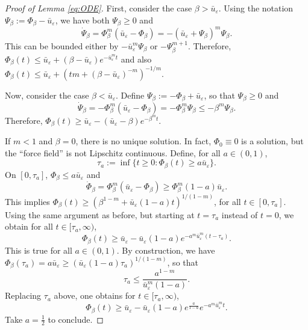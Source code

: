 \documentclass[11pt]{article}
\numberwithin{equation}{section} %
\newcommand{\ep}{\varepsilon}
\newcommand{\be}{\beta}
\def \hal{\frac{1}{2}}
\def \ep{\varepsilon}
\begin{document}
\begin{proof}[Proof of Lemma \ref{eq:ODE}]
    First, consider the case $\be >\bar u_\ep $. Using the notation $\Psi_\be :=  \Phi_\be -\bar u_\ep$, we have both $\Psi_\be \ge 0$ and
    \begin{equation*}
        \dot\Psi_\be = \Phi^m_\be (\bar u_\ep - \Phi_\be) = -(\bar u_\ep + \Psi_\be )^m\Psi_\be.
    \end{equation*}
    This can be bounded either by $-\bar u_\ep^m \Psi_\be$ or $-\Psi_\be^{m+1}$. Therefore, $\Phi_\be(t) \le \bar u_\ep + (\be - \bar u_\ep) e^{-\bar u_\ep^m t}$ and also $\Phi_\be (t) \le\bar u_\ep +  (tm + (\be -\bar u_\ep)^{-m})^{-1/m}$. 

    Now, consider the case $\be <\bar u_\ep$. Define $\Psi_\be := -\Phi_\be + \bar u_\ep$, so that $\Psi_\be\ge 0$ and
    \begin{equation*}
        \dot\Psi_\be = - \Phi_\be^m(\bar u_\ep - \Phi_\be) = -\Phi_\be^m\Psi_\be \le -\be^m \Psi_\be.
    \end{equation*}
    Therefore, $\Phi_\be(t) \ge\bar u_\ep - (\bar u_\ep -\be ) e^{-\be^mt}$.

    If $m<1$ and $\be = 0$, there is no unique solution. In fact, $\Phi_0 \equiv 0$ is a solution, but the ``force field'' is not Lipschitz continuous. Define, for all $a\in (0,1)$,
    \begin{equation*}
        \tau_a := \inf\{t\ge 0 : \Phi_\be (t) \ge a\bar u_\ep\}.
    \end{equation*}
    On $[0,\tau_a]$, $\Phi_\be \le a\bar u_\ep$ and 
    \begin{equation*}
        \dot \Phi_\be = \Phi_\be^m(\bar u_\ep - \Phi_\be)\ge \Phi_\be^m  (1-a) \bar u_\ep.
    \end{equation*}
    This implies $\Phi_\be(t) \ge (\be^{1-m} + \bar u_\ep(1-a) t)^{1/(1-m)}$, for all $t\in [0,\tau_a]$. Using the same argument as before, but starting at $t=\tau_a$ instead of $t=0$, we obtain for all $t\in [\tau_a, \infty)$,
    \begin{equation*}
        \Phi_\be(t) \ge \bar u_\ep - \bar u_\ep (1- a) e^{-a^m\bar u_\ep^m(t-\tau_a)}.
    \end{equation*}
    This is true for all $a\in (0,1)$. By construction, we have $\Phi_\be(\tau_a) = a\bar u_\ep \ge (\bar u_\ep (1-a)\tau_a )^{1/(1-m)}$, so that 
    \begin{equation*}
        \tau_a \le \frac{a^{1-m}}{\bar u_\ep^m (1-a)}.
    \end{equation*}
    Replacing $\tau_a$ above, one obtains for $t\in [\tau_a, \infty)$,
    \begin{equation*}
        \Phi_\be(t)\ge \bar u_\ep - \bar u_\ep (1-a)e^{\frac{a}{1-a}} e^{-a^m\bar u_\ep^m t}.
    \end{equation*}
    Take $a=\hal$ to conclude.
\end{proof}
\end{document}
